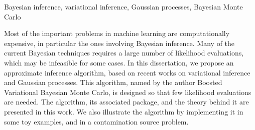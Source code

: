 
\begin{englishabstract}{}{Bayesian inference, variational inference, Gaussian processes, Bayesian Monte Carlo}



Most of the important problems in machine learning are computationally expensive, in particular the ones involving Bayesian inference. Many of the current Bayesian techniques requires a large number of likelihood evaluations, which may be infeasible for some cases. In this dissertation, we propose an approximate inference algorithm, based on recent works on variational inference and Gaussian processes. This algorithm, named by the author Boosted Variational Bayesian Monte Carlo, is designed so that few likelihood evaluations are needed. The algorithm, its associated package, and the theory behind it are presented in this work. We also illustrate the algorithm by implementing it in some toy examples, and in a contamination source problem.

\end{englishabstract}

